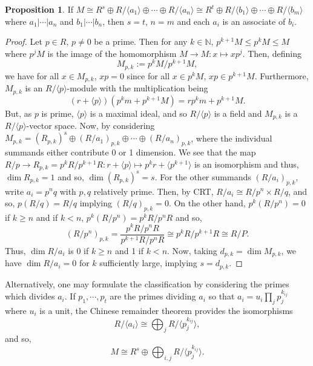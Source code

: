 \documentclass[]{article}
\theoremstyle{definition}
\theoremstyle{definition}
\newtheorem{proposition}{Proposition}[section]
\begin{document}
\begin{proposition}
  If \(M \cong R^s \oplus R / \langle a_1 \rangle 
  \oplus \cdots \oplus R / \langle a_n \rangle \cong R^t
  \oplus R / \langle b_1 \rangle
  \oplus \cdots \oplus R / \langle b_m \rangle\) where 
  \(a_1 | \cdots | a_n\) and \(b_1 | \cdots | b_n\), then 
  \(s = t\), \(n = m\) and each \(a_i\) is an associate of \(b_i\).
\end{proposition}
\begin{proof}
  Let \(p \in R\), \(p \neq 0\) be a prime. Then for any \(k \in \mathbb{N}\), 
  \(p^{k + 1}M \le p^kM \le M\) where \(p^j M\) is the image of 
  the homomorphism \(M \to M : x \mapsto xp^j\). Then, defining 
  \[M_{p, k} := p^k M / p^{k + 1} M,\]
  we have for all \(x \in M_{p, k}\), \(xp = 0\) since for all \(x \in p^k M\), 
  \(xp \in p^{k + 1}M\). Furthermore, \(M_{p, k}\) is an 
  \(R / \langle p \rangle\)-module with the multiplication being 
  \[(r + \langle p \rangle)(p^k m + p^{k + 1}M) = rp^km + p^{k + 1}M.\]
  But, as \(p\) is prime, \(\langle p \rangle\) is a maximal ideal, and so 
  \(R / \langle p \rangle\) is a field and \(M_{p, k}\) is a 
  \(R / \langle p \rangle\)-vector space. Now, by considering 
  \(M_{p, k} = (R_{p, k})^s \oplus (R / a_1)_{p, k} \oplus \cdots \oplus (R / a_n)_{p, k}\),
  where the individual summands either contribute 0 or 1 dimension. 
  We see that the map \(R / p \to R_{p, k} = p^k R / p^{k + 1}R : 
  r + \langle p \rangle \mapsto p^k r + \langle p^{k + 1} \rangle\) is an 
  isomorphism and thus, \(\dim R_{p, k} = 1\) and so, \(\dim (R_{p, k})^s = s\).
  For the other summands \((R / a_i)_{p, k}\), write \(a_i = p^n q\) with 
  \(p, q\) relatively prime. Then, by CRT, \(R / a_i \cong R / p^n \times R / q\),
  and so, \(p(R / q) = R / q\) implying \((R / q)_{p, k} = 0\). On the other 
  hand, \(p^k(R / p^n) = 0\) if \(k \ge n\) and if \(k < n\), 
  \(p^k(R / p^n) = p^k R / p^n R\) and so, 
  \[(R / p^n)_{p, k} = \frac{p^k R / p^n R}{p^{k + 1} R / p^n R} \cong 
  p^k R / p^{k + 1}R \cong R / P.\] 
  Thus, \(\dim R / a_i\) is 0 if \(k \ge n\) and 1 if \(k < n\).
  Now, taking \(d_{p, k} = \dim M_{p, k}\), we have \(\dim R / a_i = 0\) 
  for \(k\) sufficiently large, implying \(s = d_{p, k}\).
\end{proof}

Alternatively, one may formulate the classification by considering the 
primes which divides \(a_i\). If \(p_1, \cdots, p_t\) are the primes dividing 
\(a_i\) so that \(a_i = u_i \prod_j p_j^{k_{ij}}\) where \(u_i\) is a unit, 
the Chinese remainder theorem provides the isomorphisms
\[R / \langle a_i \rangle \cong \bigoplus_j R / \langle p_j^{k_{ij}} \rangle,\]
and so, 
\[M \cong R^s \oplus \bigoplus_{i, j} R / \langle p_j^{k_{ij}} \rangle.\]
\end{document}
